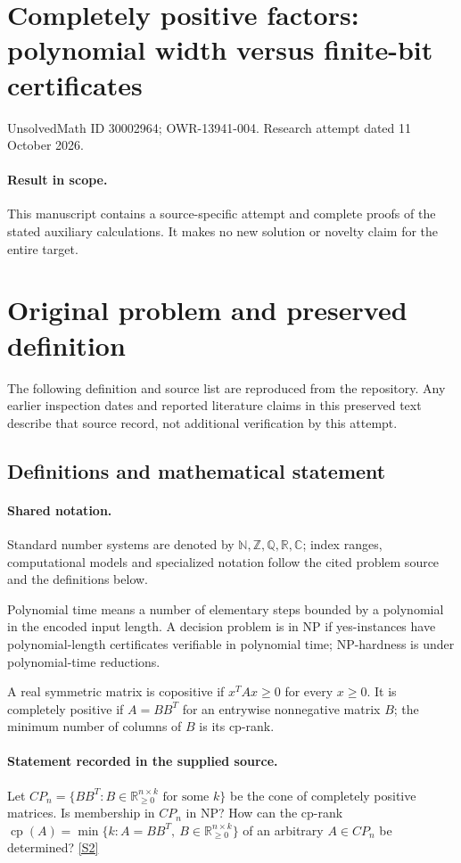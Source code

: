 \documentclass[11pt]{article}
\begin{document}
\section*{Completely positive factors: polynomial width versus finite-bit certificates}
\noindent UnsolvedMath ID 30002964; OWR-13941-004. Research attempt dated 11 October 2026.
\paragraph{Result in scope.}This manuscript contains a source-specific attempt and complete proofs of the stated auxiliary calculations. It makes no new solution or novelty claim for the entire target.
\section{Original problem and preserved definition}
The following definition and source list are reproduced from the repository. Any earlier inspection dates and reported literature claims in this preserved text describe that source record, not additional verification by this attempt.
\subsection{Definitions and mathematical statement}

\paragraph{Shared notation.}Standard number systems are denoted by $\mathbb N,\mathbb Z,\mathbb Q,\mathbb R,\mathbb C$; index ranges, computational models and specialized notation follow the cited problem source and the definitions below.


Polynomial time means a number of elementary steps bounded by a polynomial in the encoded input length. A decision problem is in $\mathrm{NP}$ if yes-instances have polynomial-length certificates verifiable in polynomial time; NP-hardness is under polynomial-time reductions.

A real symmetric matrix is copositive if $x^TAx\geq0$ for every $x\geq0$. It is completely positive if $A=BB^T$ for an entrywise nonnegative matrix $B$; the minimum number of columns of $B$ is its cp-rank.
\paragraph{Statement recorded in the supplied source.}
Let $CP_n=\{BB^T:B\in\mathbb R_{\geq0}^{n\times k}\text{ for some }k\}$ be the cone of completely positive matrices. Is membership in $CP_n$ in NP? How can the cp-rank $\operatorname{cp}(A)=\min\{k:A=BB^T,\ B\in\mathbb R_{\geq0}^{n\times k}\}$ of an arbitrary $A\in CP_n$ be determined? \href{https://doi.org/10.4171/owr/2015/46}{[S2]}
\end{document}
